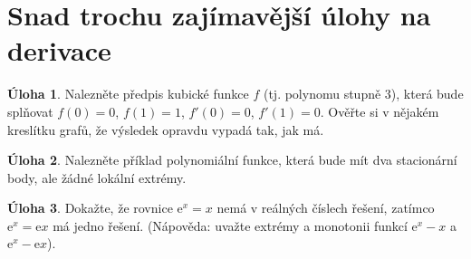 \documentclass[12pt,a4paper]{article}
\theoremstyle{definition}
\newtheorem{uloha}{Úloha}
\def\ee{\mathrm{e}}
\begin{document}
\section*{Snad trochu zajímavější úlohy na derivace}

\begin{uloha}
Nalezněte předpis kubické funkce $f$ (tj. polynomu stupně 3), která bude splňovat $f(0) = 0$, $f(1) = 1$, $f'(0) = 0$, $f'(1) = 0$. Ověřte si v nějakém kreslítku grafů, že výsledek opravdu vypadá tak, jak má.
\end{uloha}

\begin{uloha}
Nalezněte příklad polynomiální funkce, která bude mít dva stacionární body, ale žádné lokální extrémy.
\end{uloha}

\begin{uloha}
Dokažte, že rovnice $\ee^x = x$ nemá v reálných číslech řešení, zatímco $\ee^{x} = \ee x$ má jedno řešení. (Nápověda: uvažte extrémy a monotonii funkcí $\ee^x - x$ a $\ee^x - \ee x$).
\end{uloha}
\end{document}
